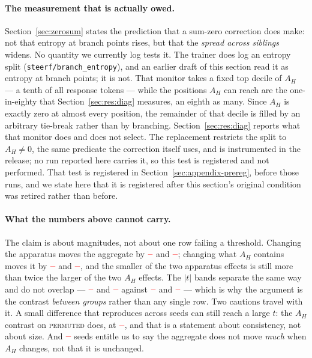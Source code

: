 \documentclass[11pt]{article}
\newcommand{\AH}{A_{H}}
\providecommand{\PENDING}{\textcolor{red}{\textbf{--}}}
\newcommand{\num}[1]{\ifcsname #1\endcsname\csname #1\endcsname\else\PENDING\fi}
\begin{document}
\paragraph{The measurement that is actually owed.} Section~\ref{sec:zerosum} states
the prediction that a sum-zero correction does make: not that entropy at branch
points rises, but that the \emph{spread across siblings} widens. No quantity we
currently log tests it. The trainer does log an entropy split
(\texttt{steerf/branch\_entropy}), and an earlier draft of this section read it as
entropy at branch points; it is not. That monitor takes a fixed top decile of
$\AH$ --- a tenth of all response tokens --- while the positions $\AH$ can reach are
the one-in-eighty that Section~\ref{sec:res:diag} measures, an eighth as many. Since
$\AH$ is exactly zero at almost every position, the remainder of that decile is
filled by an arbitrary tie-break rather than by branching. Section~\ref{sec:res:diag} reports
what that monitor does and does not select. The replacement restricts the split to
$\AH \ne 0$, the same predicate the correction itself uses, and is instrumented in
the release; no run reported here carries it, so this test is registered and not
performed. That test is registered
in Section~\ref{sec:appendix-prereg}, before those runs, and we state here that it
is registered after this section's original condition was retired rather than
before.

\paragraph{What the numbers above cannot carry.} The claim is about magnitudes, not
about one row failing a threshold. Changing the apparatus moves the aggregate by
$\num{Cuniformsteerentropy}$ and $\num{Csteergrpoentropy}$; changing what $\AH$
contains moves it by $\num{Csignedpermutedentropy}$ and
$\num{Csigneduniformentropy}$, and the smaller of the two apparatus effects is still
more than twice the larger of the two $\AH$ effects. The $|t|$ bands separate the
same way and do not overlap --- $\num{Tsteergrpoentropy}$ and
$\num{Tuniformsteerentropy}$ against $\num{Tsigneduniformentropy}$ and
$\num{Tsignedpermutedentropy}$ --- which is why the argument is the contrast
\emph{between groups} rather than any single row. Two cautions travel with it. A
small difference that reproduces across seeds can still reach a large $t$: the
$\AH$ contrast on \textsc{permuted} does, at $\num{Csignedpermutedentropy}$, and
that is a statement about consistency, not about size. And $\num{Nsigneduniform}$
seeds entitle us to say the aggregate does not move \emph{much} when $\AH$ changes,
not that it is unchanged.
\end{document}
